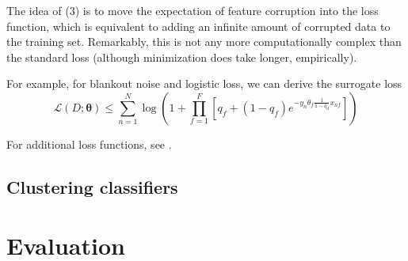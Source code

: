 The idea of (3) is to move the expectation of feature corruption into the loss function, which is equivalent to adding an infinite amount of corrupted data to the training set.
Remarkably, this is not any more computationally complex than the standard loss (although minimization does take longer, empirically).

For example, for blankout noise and logistic loss, we can derive the surrogate loss
\begin{equation}
\mathcal{L}(D; \mathbf{\theta}) \leq \sum_{n=1}^N \log \left( 1 + \prod_{f=1}^F \left[ q_f + (1 - q_f) e^{-y_n \theta_f \frac{1}{1 - q_d} x_{nf}} \right] \right)
\end{equation}

For additional loss functions, see \cite{Maaten-ICML-2013}.

\subsection{Clustering classifiers}

\section{Evaluation}




